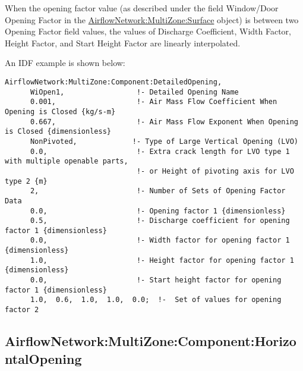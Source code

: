 When the opening factor value (as described under the field Window/Door Opening Factor in the \hyperref[airflownetworkmultizonesurface]{AirflowNetwork:MultiZone:Surface} object) is between two Opening Factor field values, the values of Discharge Coefficient, Width Factor, Height Factor, and Start Height Factor are linearly interpolated.

An IDF example is shown below:

\begin{lstlisting}
AirflowNetwork:MultiZone:Component:DetailedOpening,
      WiOpen1,                 !- Detailed Opening Name
      0.001,                   !- Air Mass Flow Coefficient When Opening is Closed {kg/s-m}
      0.667,                   !- Air Mass Flow Exponent When Opening is Closed {dimensionless}
      NonPivoted,             !- Type of Large Vertical Opening (LVO)
      0.0,                     !- Extra crack length for LVO type 1 with multiple openable parts,
                               !- or Height of pivoting axis for LVO type 2 {m}
      2,                       !- Number of Sets of Opening Factor Data
      0.0,                     !- Opening factor 1 {dimensionless}
      0.5,                     !- Discharge coefficient for opening factor 1 {dimensionless}
      0.0,                     !- Width factor for opening factor 1 {dimensionless}
      1.0,                     !- Height factor for opening factor 1 {dimensionless}
      0.0,                     !- Start height factor for opening factor 1 {dimensionless}
      1.0,  0.6,  1.0,  1.0,  0.0;  !-  Set of values for opening factor 2
\end{lstlisting}

\subsection{AirflowNetwork:MultiZone:Component:HorizontalOpening}\label{airflownetworkmultizonecomponenthorizontalopening}

